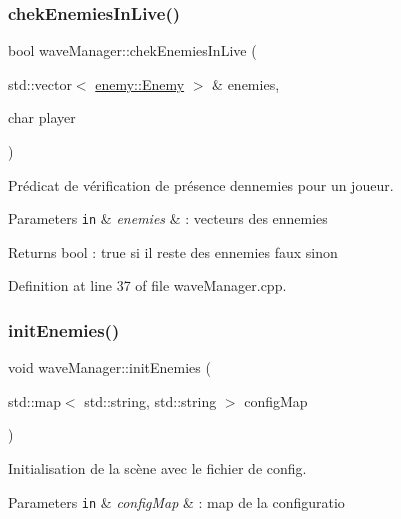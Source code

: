 \subsubsection{\texorpdfstring{chek\+Enemies\+In\+Live()}{chekEnemiesInLive()}}
{\footnotesize\ttfamily bool wave\+Manager\+::chek\+Enemies\+In\+Live (\begin{DoxyParamCaption}\item[{std\+::vector$<$ \hyperlink{structenemy_1_1_enemy}{enemy\+::\+Enemy} $>$ \&}]{enemies,  }\item[{char}]{player }\end{DoxyParamCaption})}



Prédicat de vérification de présence d\textquotesingle{}ennemies pour un joueur. 


\begin{DoxyParams}[1]{Parameters}
\mbox{\tt in}  & {\em enemies} & \+: vecteurs des ennemies \\
\hline
\end{DoxyParams}
\begin{DoxyReturn}{Returns}
bool \+: true si il reste des ennemies faux sinon 
\end{DoxyReturn}


Definition at line 37 of file wave\+Manager.\+cpp.

\mbox{\label{namespacewave_manager_a2a5b7f2a1dd69a5f1188924fc0cd3a9a}} 
\subsubsection{\texorpdfstring{init\+Enemies()}{initEnemies()}}
{\footnotesize\ttfamily void wave\+Manager\+::init\+Enemies (\begin{DoxyParamCaption}\item[{std\+::map$<$ std\+::string, std\+::string $>$}]{config\+Map }\end{DoxyParamCaption})}



Initialisation de la scène avec le fichier de config. 


\begin{DoxyParams}[1]{Parameters}
\mbox{\tt in}  & {\em config\+Map} & \+: map de la configuratio \\
\hline
\end{DoxyParams}


